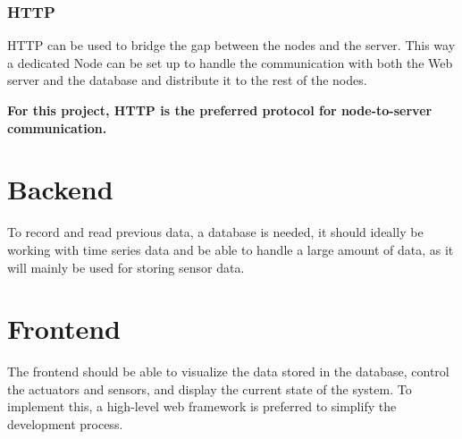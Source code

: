             \subsubsection{HTTP}
            HTTP can be used to bridge the gap between the nodes and the server.
            This way a dedicated Node can be set up to handle the communication
            with both the Web server and the database and distribute it to the 
            rest of the nodes.
        
            \vspace{1cm}
            \textbf{For this project, HTTP is the preferred protocol for 
            node-to-server communication.}

    \section{Backend}
    To record and read previous data, a database is needed, it should ideally be 
    working with time series data and be able to handle a large amount of data, 
    as it will mainly be used for storing sensor data.

    \section{Frontend}
    The frontend should be able to visualize the data stored in the database,
    control the actuators and sensors, and display the current state of the 
    system. To implement this, a high-level web framework is preferred to 
    simplify the development process. 